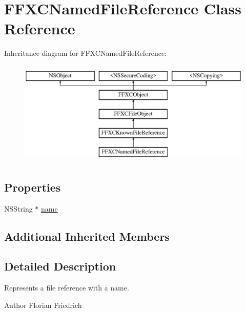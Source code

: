 \hypertarget{interface_f_f_x_c_named_file_reference}{\section{F\-F\-X\-C\-Named\-File\-Reference Class Reference}
\label{interface_f_f_x_c_named_file_reference}
}
Inheritance diagram for F\-F\-X\-C\-Named\-File\-Reference\-:\begin{figure}[H]
\begin{center}
\leavevmode
\includegraphics[height=5.000000cm]{interface_f_f_x_c_named_file_reference}
\end{center}
\end{figure}
\subsection*{Properties}
\begin{DoxyCompactItemize}
\item 
N\-S\-String $\ast$ \hyperlink{interface_f_f_x_c_named_file_reference_a4b93d352d2fca75b34e1b5a50e03f587}{name}
\end{DoxyCompactItemize}
\subsection*{Additional Inherited Members}


\subsection{Detailed Description}
Represents a file reference with a name. \begin{DoxyAuthor}{Author}
Florian Friedrich 
\end{DoxyAuthor}


